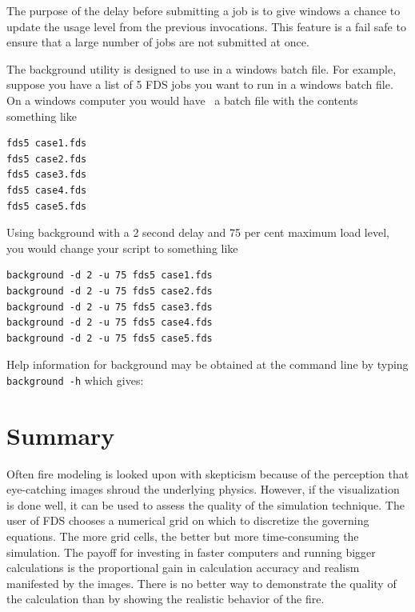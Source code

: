 \documentclass[11pt,twoside]{book}
\begin{document}
The purpose of the delay before submitting a job is to give windows a chance to update the usage level from the
previous invocations.  This feature is a fail safe to ensure that a large number of jobs are not
submitted at once.

The background utility is designed to use in a windows batch file. For example, suppose you have
a list of 5 FDS jobs you want to run in a windows batch file. On a windows computer you would have \
a batch file with the contents something like

\begin{verbatim}
fds5 case1.fds
fds5 case2.fds
fds5 case3.fds
fds5 case4.fds
fds5 case5.fds
\end{verbatim}

Using background with a 2 second delay and 75 per cent maximum load level, you would change your script to something like

\begin{verbatim}
background -d 2 -u 75 fds5 case1.fds
background -d 2 -u 75 fds5 case2.fds
background -d 2 -u 75 fds5 case3.fds
background -d 2 -u 75 fds5 case4.fds
background -d 2 -u 75 fds5 case5.fds
\end{verbatim}

Help information for background may be obtained at the command line by typing {\tt background -h} which gives:

{
\scriptsize

}


\chapter{Summary}
Often fire modeling is looked upon with skepticism because of the
perception that eye-catching images shroud the underlying physics.
However, if the visualization is done well, it can be used to
assess the quality of the simulation technique. The user of FDS
chooses a numerical grid on which to discretize the governing
equations. The more grid cells, the better but more time-consuming
the simulation. The payoff for investing in faster computers and
running bigger calculations is the proportional gain in calculation accuracy and realism
manifested by the images. There is no better way to demonstrate
the quality of the calculation than by showing the realistic
behavior of the fire.
\end{document}
